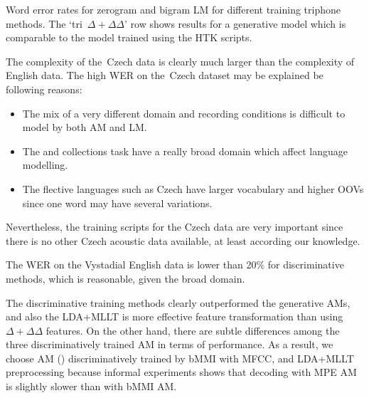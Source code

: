 \begin{table}[h]

\caption{Word error rates for zerogram and bigram LM for different training triphone methods.
    The `tri~$\Delta+\Delta\Delta$' row shows results for a generative model which is comparable to the model trained using the HTK scripts.
}
\label{tab:best}
\end{table}

The complexity of the~Czech data is clearly much larger than the complexity of English data.
The high \ac{WER} on the~Czech dataset may be explained be following reasons:
\begin{itemize}
    \item The mix of a very different domain and recording conditions is difficult to model by both \ac{AM} and \ac{LM}. 
    \item The  and  collections task have a really broad domain which affect language modelling.
    \item The flective languages such as Czech have larger vocabulary and higher \acp{OOV} since one word may have several variations.
\end{itemize}
Nevertheless, the training scripts for the Czech data are very important since there is no other Czech acoustic data available, at least according our knowledge.

The \ac{WER} on the Vystadial English data is lower than 20\% for discriminative methods, which is reasonable, given the broad domain.

The discriminative training methods clearly outperformed the generative \acp{AM}, and also the \ac{LDA}+\ac{MLLT} is more effective feature transformation than using $\Delta+\Delta\Delta$ features.
On the other hand, there are subtle differences among the three discriminatively trained \ac{AM} in terms of performance.
As a result, we choose \ac{AM} () discriminatively trained by \ac{bMMI} with \ac{MFCC}, and \ac{LDA}+\ac{MLLT} preprocessing because informal experiments shows that decoding with \ac{MPE} \acl{AM} is slightly slower than with \ac{bMMI} \ac{AM}. 


